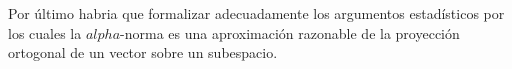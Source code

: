 \documentclass[conference,compsoc,a4paper]{IEEEtran}
\begin{document}
\bigskip

Por último habria que formalizar adecuadamente los argumentos 
estadísticos por los cuales la $alpha$-norma es una aproximación 
razonable de la proyección ortogonal de un vector sobre un subespacio.

%
%



%
%
\end{document}
